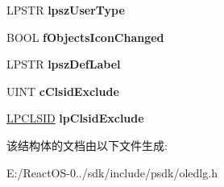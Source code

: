 \begin{DoxyCompactItemize}
L\+P\+S\+TR {\bfseries lpsz\+User\+Type}
\item 
\mbox{\label{structtag_o_l_e_u_i_c_o_n_v_e_r_t_a_a13d8940ea9ec68d3fe7873ad8cf49322}} 
B\+O\+OL {\bfseries f\+Objects\+Icon\+Changed}
\item 
\mbox{\label{structtag_o_l_e_u_i_c_o_n_v_e_r_t_a_a42eadfda6ec03e959d2b296155c8b2bc}} 
L\+P\+S\+TR {\bfseries lpsz\+Def\+Label}
\item 
\mbox{\label{structtag_o_l_e_u_i_c_o_n_v_e_r_t_a_a0c33d36c84379f21cfc504be318f12b9}} 
U\+I\+NT {\bfseries c\+Clsid\+Exclude}
\item 
\mbox{\label{structtag_o_l_e_u_i_c_o_n_v_e_r_t_a_a4283347784d8c0032970b5e2c86e3dbf}} 
\hyperlink{interface_g_u_i_d}{L\+P\+C\+L\+S\+ID} {\bfseries lp\+Clsid\+Exclude}
\end{DoxyCompactItemize}


该结构体的文档由以下文件生成\+:\begin{DoxyCompactItemize}
\item 
E\+:/\+React\+O\+S-\/0../sdk/include/psdk/oledlg.\+h\end{DoxyCompactItemize}
